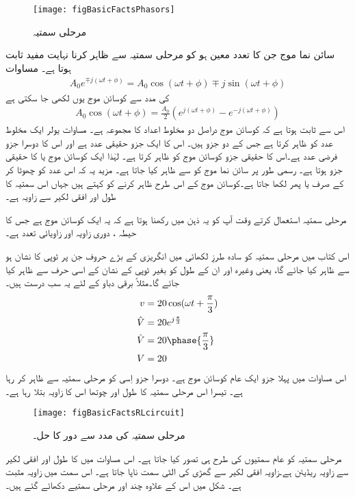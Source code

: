 \begin{figure}
\centering
\texttt{[image: figBasicFactsPhasors]}
\caption{مرحلی سمتیہ}
\label{شکل_حقائق_دوری_سمتیات}
\end{figure}
سائن نما موج جن کا تعدد معین ہو کو مرحلی سمتیہ سے ظاہر کرنا نہایت مفید ثابت ہوتا ہے۔ مساوات 
\begin{align}
A_0 e^{\mp j (\omega t + \phi)}=A_0 \cos (\omega t +\phi) \mp j \sin (\omega t+\phi)
\end{align}
کی مدد سے کوسائن موج یوں لکھی جا سکتی ہے
\begin{align}
A_0 \cos (\omega t +\phi)=\frac{A_0}{2} \left(e^{j(\omega t +\phi)} -e^{-j(\omega t +\phi)}\right)
\end{align}
اس سے ثابت ہوتا ہے کہ کوسائن موج دراصل دو مخلوط اعداد کا مجموعہ ہے۔ مساوات یولر ایک مخلوط عدد کو ظاہر کرتا ہے جس کے دو جزو ہیں۔ اس کا ایک جزو حقیقی عدد ہے اور اس کا دوسرا جزو فرضی عدد ہے۔اس کا حقیقی جزو کوسائن موج کو ظاہر کرتا ہے۔ لہٰذا ایک کوسائن موج   یا  کا حقیقی جزو ہوتا ہے۔ رسمی طور پر سائن نما موج کو  سے ظاہر کیا جاتا ہے۔ مزید یہ کہ اس عدد کو چھوٹا کر کے صرف  یا پھر  لکھا جاتا ہے۔کوسائن موج کے اس طرح ظاہر کرنے کو  کہتے ہیں جہاں اس سمتیہ کا طول  اور افقی لکیر سے زاویہ  ہے۔

	 مرحلی سمتیہ استعمال کرتے وقت آپ کو یہ ذہن میں رکھنا ہوتا ہے کہ یہ ایک کوسائن موج ہے جس کا حیطہ   ، دوری زاویہ  اور زاویائی تعدد  ہے۔

اس کتاب میں مرحلی سمتیہ کو سادہ طرزِ لکھائی میں انگریزی کے بڑے حروف جن پر ٹوپی کا نشان ہو سے ظاہر کیا جائے گا، یعنی   وغیرہ اور ان کے طول کو بغیر ٹوپی کے نشان کے اسی حرف سے ظاہر کیا جائے گا۔مثلاً برقی دباو  کے لئے یہ سب درست ہیں۔
\begin{gather}
\begin{aligned}
v&=20 \cos (\omega t +\frac{\pi}{3})\\
\hat{V}&=20 e^{j \frac{\pi}{3}}\\
\hat{V}&=20 \phase{\frac{\pi}{3}}\\
V&=20
\end{aligned}
\end{gather}
اس مساوات میں پہلا جزو ایک عام کوسائن موج ہے۔ دوسرا جزو اِسی کو مرحلی سمتیہ سے ظاہر کر رہا ہے۔ تیسرا اس مرحلی سمتیہ کا طول اور چوتھا اس کا زاویہ بتلا رہا ہے۔
\begin{figure}
\centering
\texttt{[image: figBasicFactsRLcircuit]}
\caption{مرحلی سمتیہ کی مدد سے  دور کا حل۔}
\label{شکل_حقائق_دوری_سمتیہ_سے_دور_حل}
\end{figure}
	مرحلی سمتیہ کو عام سمتیوں کی طرح ہی تصور کیا جاتا ہے۔ اس مساوات میں  کا طول  اور افقی لکیر سے زاویہ   ریڈیئن ہے۔زاویہ افقی لکیر سے گھڑی کی الٹی سمت ناپا جاتا ہے۔ اس سمت میں زاویہ مثبت ہے۔ شکل  میں اس  کے علاوہ چند اور مرحلی سمتیے دکھائے گئے ہیں۔

